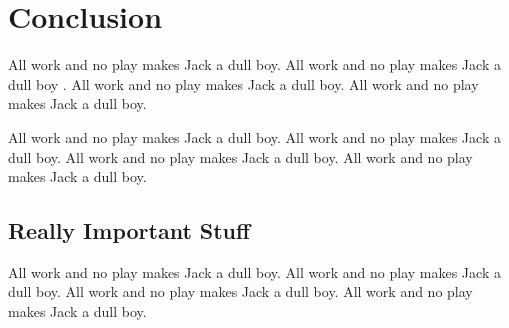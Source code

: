 
%
%

%
%

\section{Conclusion}
\label{sec:conclusion}

All work and no play makes Jack a dull boy.
All work and no play makes Jack a dull boy \cite{knuth-website}.
All work and no play makes Jack a dull boy.
All work and no play makes Jack a dull boy.

All work and no play makes Jack a dull boy.
All work and no play makes Jack a dull boy.
All work and no play makes Jack a dull boy.
All work and no play makes Jack a dull boy.

\subsection{Really Important Stuff}
\label{sec:conclusions_important_stuff}

All work and no play makes Jack a dull boy.
All work and no play makes Jack a dull boy.
All work and no play makes Jack a dull boy.
All work and no play makes Jack a dull boy.
